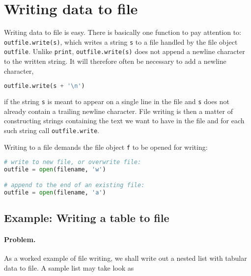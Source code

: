 \documentclass[graybox,sectrefs,envcountresetchap,open=right,final]{svmonodo}
\begin{document}
\section{Writing data to file}
\label{sec:files:writing}

Writing data to file is easy.
There is basically one function to pay attention to: \texttt{outfile.write(s)},
which writes a string \texttt{s} to
a file handled by the file object \texttt{outfile}. Unlike \texttt{print},
\texttt{outfile.write(s)}
does not append a newline character to the written string.
It will therefore
often be necessary to add a newline character,



\begin{lstlisting}[language=python,style=simple,xleftmargin=2mm]
outfile.write(s + '\n')

\end{lstlisting}

if the string \texttt{s} is meant to appear on a single line in the file
and \texttt{s} does not already contain a trailing newline character.
File writing is then a matter of constructing strings containing the
text we want to have in the file and for each such string call
\texttt{outfile.write}.

Writing to a file demands
the file object \texttt{f}
to be opened for writing:







\begin{lstlisting}[language=python,style=simple,xleftmargin=2mm]
# write to new file, or overwrite file:
outfile = open(filename, 'w')

# append to the end of an existing file:
outfile = open(filename, 'a')

\end{lstlisting}


\subsection{Example: Writing a table to file}

\paragraph{Problem.}
As a worked example of file writing,
we shall write out a nested list with tabular data to file.
A sample list may take look as
\end{document}
